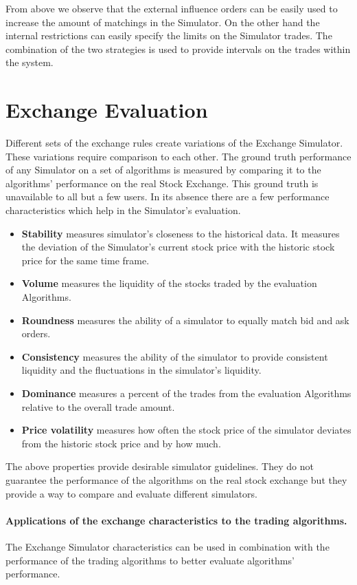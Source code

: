 \documentclass{article}
\begin{document}
From above we observe that the external influence orders can be easily used to increase the amount of matchings in the Simulator. On the other hand the internal restrictions can easily specify the limits on the Simulator trades. The combination of the two strategies is used to provide intervals on the trades within the system. 

\section{Exchange Evaluation}

Different sets of the exchange rules create variations of the Exchange Simulator. These variations require comparison to each other. The ground truth performance of any Simulator on a set of algorithms is measured by comparing it to the algorithms' performance on the real Stock Exchange. This ground truth is unavailable to all but a few users. In its absence there are a few performance characteristics which help in the Simulator's evaluation.

\begin{itemize}
    \item {\bf Stability} measures simulator's closeness to the historical data. It measures the deviation of the Simulator's current stock price with the historic stock price for the same time frame. 
    \item {\bf Volume} measures the liquidity of the stocks traded by the evaluation Algorithms. 
    \item {\bf Roundness} measures the ability of a simulator to equally match bid and ask orders. 
    \item {\bf Consistency} measures the ability of the simulator to provide consistent liquidity and the fluctuations in the simulator's liquidity. 
    \item {\bf Dominance} measures a percent of the trades from the evaluation Algorithms relative to the overall trade amount. 
    \item {\bf Price volatility} measures how often the stock price of the simulator deviates from the historic stock price and by how much.
\end{itemize}

The above properties provide desirable simulator guidelines. They do not guarantee the performance of the algorithms on the real stock exchange but they provide a way to compare and evaluate different simulators.

\paragraph{Applications of the exchange characteristics to the trading algorithms.} 
The Exchange Simulator characteristics can be used in combination with the performance of the trading algorithms to better evaluate algorithms' performance.
\end{document}
